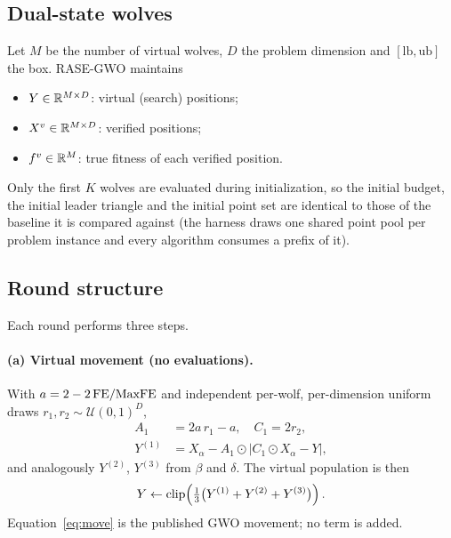 \subsection{Dual-state wolves}

Let $M$ be the number of virtual wolves, $D$ the problem dimension and
$[\mathrm{lb},\mathrm{ub}]$ the box. RASE-GWO maintains
\begin{itemize}
  \item $Y \in \mathbb{R}^{M\times D}$: virtual (search) positions;
  \item $X^{v} \in \mathbb{R}^{M\times D}$: verified positions;
  \item $f^{v} \in \mathbb{R}^{M}$: true fitness of each verified position.
\end{itemize}
Only the first $K$ wolves are evaluated during initialization, so the
initial budget, the initial leader triangle and the initial point set are
identical to those of the baseline it is compared against (the harness draws one
shared point pool per problem instance and every algorithm consumes a prefix of
it).

\subsection{Round structure}

Each round performs three steps.

\paragraph{(a) Virtual movement (no evaluations).}
With $a = 2-2\,\mathrm{FE}/\mathrm{MaxFE}$ and independent per-wolf, per-dimension
uniform draws $r_1, r_2 \sim \mathcal{U}(0,1)^D$,
\begin{equation}
\begin{aligned}
A_1 &= 2 a\, r_1 - a, \quad C_1 = 2 r_2, \\
Y^{(1)} &= X_\alpha - A_1 \odot \lvert C_1 \odot X_\alpha - Y \rvert,
\end{aligned}
\end{equation}
and analogously $Y^{(2)}$, $Y^{(3)}$ from $\beta$ and $\delta$. The virtual
population is then
\begin{equation}
Y \leftarrow \operatorname{clip}\!\left(\tfrac{1}{3}\bigl(Y^{(1)}+Y^{(2)}+Y^{(3)}\bigr)\right).
\label{eq:move}
\end{equation}
Equation~\eqref{eq:move} is the published GWO movement; no term is added.

